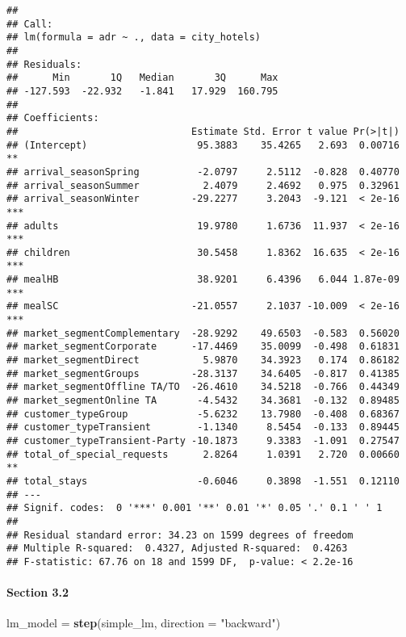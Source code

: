 \documentclass[]{article}
\newenvironment{Shaded}{\begin{snugshade}}{\end{snugshade}}
\newcommand{\DataTypeTok}[1]{\textcolor[rgb]{0.13,0.29,0.53}{#1}}
\newcommand{\KeywordTok}[1]{\textcolor[rgb]{0.13,0.29,0.53}{\textbf{#1}}}
\newcommand{\NormalTok}[1]{#1}
\newcommand{\StringTok}[1]{\textcolor[rgb]{0.31,0.60,0.02}{#1}}
\let\oldparagraph\paragraph
\renewcommand{\paragraph}[1]{\oldparagraph{#1}\mbox{}}
\begin{document}
\begin{verbatim}
## 
## Call:
## lm(formula = adr ~ ., data = city_hotels)
## 
## Residuals:
##      Min       1Q   Median       3Q      Max 
## -127.593  -22.932   -1.841   17.929  160.795 
## 
## Coefficients:
##                              Estimate Std. Error t value Pr(>|t|)    
## (Intercept)                   95.3883    35.4265   2.693  0.00716 ** 
## arrival_seasonSpring          -2.0797     2.5112  -0.828  0.40770    
## arrival_seasonSummer           2.4079     2.4692   0.975  0.32961    
## arrival_seasonWinter         -29.2277     3.2043  -9.121  < 2e-16 ***
## adults                        19.9780     1.6736  11.937  < 2e-16 ***
## children                      30.5458     1.8362  16.635  < 2e-16 ***
## mealHB                        38.9201     6.4396   6.044 1.87e-09 ***
## mealSC                       -21.0557     2.1037 -10.009  < 2e-16 ***
## market_segmentComplementary  -28.9292    49.6503  -0.583  0.56020    
## market_segmentCorporate      -17.4469    35.0099  -0.498  0.61831    
## market_segmentDirect           5.9870    34.3923   0.174  0.86182    
## market_segmentGroups         -28.3137    34.6405  -0.817  0.41385    
## market_segmentOffline TA/TO  -26.4610    34.5218  -0.766  0.44349    
## market_segmentOnline TA       -4.5432    34.3681  -0.132  0.89485    
## customer_typeGroup            -5.6232    13.7980  -0.408  0.68367    
## customer_typeTransient        -1.1340     8.5454  -0.133  0.89445    
## customer_typeTransient-Party -10.1873     9.3383  -1.091  0.27547    
## total_of_special_requests      2.8264     1.0391   2.720  0.00660 ** 
## total_stays                   -0.6046     0.3898  -1.551  0.12110    
## ---
## Signif. codes:  0 '***' 0.001 '**' 0.01 '*' 0.05 '.' 0.1 ' ' 1
## 
## Residual standard error: 34.23 on 1599 degrees of freedom
## Multiple R-squared:  0.4327, Adjusted R-squared:  0.4263 
## F-statistic: 67.76 on 18 and 1599 DF,  p-value: < 2.2e-16
\end{verbatim}

\hypertarget{section-3.2}{%
\paragraph{Section 3.2}\label{section-3.2}}

\begin{Shaded}
\begin{Highlighting}[]
\NormalTok{lm_model =}\StringTok{ }\KeywordTok{step}\NormalTok{(simple_lm, }\DataTypeTok{direction =} \StringTok{"backward"}\NormalTok{)}
\end{Highlighting}
\end{Shaded}
\end{document}
